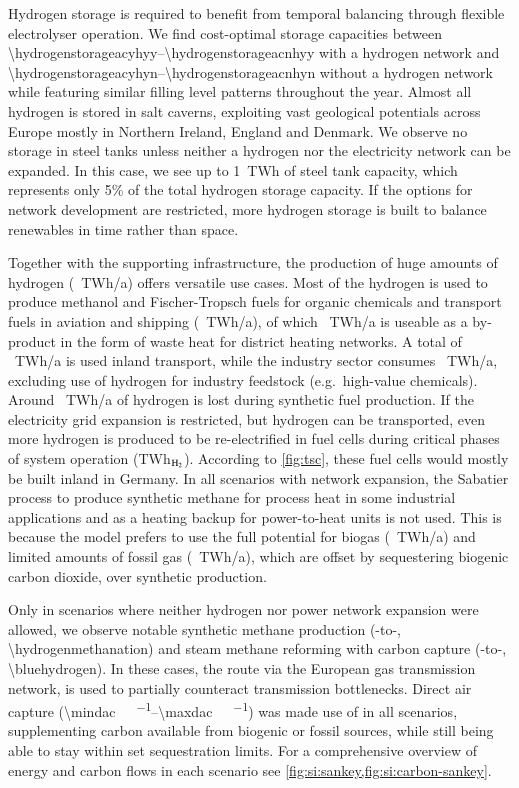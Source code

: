 Hydrogen storage is required to benefit from temporal balancing through flexible
electrolyser operation. We find cost-optimal storage capacities between
\SIrange{\hydrogenstorageacyhyy}{\hydrogenstorageacnhyy}{\twh} with a hydrogen
network and \SIrange{\hydrogenstorageacyhyn}{\hydrogenstorageacnhyn}{\twh}
without a hydrogen network while featuring similar filling level patterns
throughout the year. Almost all hydrogen is stored in salt caverns, exploiting
vast geological potentials across Europe mostly in Northern Ireland, England and
Denmark. We observe no storage in steel tanks unless neither a hydrogen nor the
electricity network can be expanded. In this case, we see up to 1~TWh of steel
tank capacity, which represents only 5\% of the total hydrogen
storage capacity. If the options for network development are restricted, more
hydrogen storage is built to balance renewables in time rather than space.

Together with the supporting infrastructure, the production of huge amounts of
hydrogen (\hydrogenproduction~TWh/a) offers versatile use cases. Most of the
hydrogen is used to produce methanol and Fischer-Tropsch fuels for organic
chemicals and transport fuels in aviation and shipping
(\ptlhydrogenusage~TWh/a), of which \ptlwasteheat~TWh/a is useable as a
by-product in the form of waste heat for district heating networks. A total of
\hydrogentransportdemand~TWh/a is used inland transport, while the industry
sector consumes \hydrogenindustrydemand~TWh/a, excluding use of hydrogen for
industry feedstock (e.g.~high-value chemicals). Around \hydrogenlosses~TWh/a of
hydrogen is lost during synthetic fuel production. If the electricity grid
expansion is restricted, but hydrogen can be transported, even more hydrogen is
produced to be re-electrified in fuel cells during critical phases of system
operation (\hydrogenfuelcell TWh$_{\ce{H2}}$). According to \cref{fig:tsc},
these fuel cells would mostly be built inland in Germany. In all scenarios with
network expansion, the Sabatier process to produce synthetic methane for process
heat in some industrial applications and as a heating backup for power-to-heat
units is not used. This is because the model prefers to use the full potential
for biogas (\biogas~TWh/a) and limited amounts of fossil gas (\fossilgas~TWh/a),
which are offset by sequestering biogenic carbon dioxide, over synthetic
production.

Only in scenarios where neither hydrogen nor power network expansion were
allowed, we observe notable synthetic methane production (-to-,
\SI{\hydrogenmethanation}{\twh}) and steam methane reforming with carbon capture
(-to-, \SI{\bluehydrogen}{\twh}). In these cases, the route via
the European gas transmission network, is used to partially counteract
transmission bottlenecks. Direct air capture
(\SIrange{\mindac}{\maxdac}{\mega\tco\per\year}) was made use of in all
scenarios, supplementing carbon available from biogenic or fossil sources, while
still being able to stay within set sequestration limits. For a comprehensive
overview of energy and carbon flows in each scenario see
\cref{fig:si:sankey,fig:si:carbon-sankey}.

